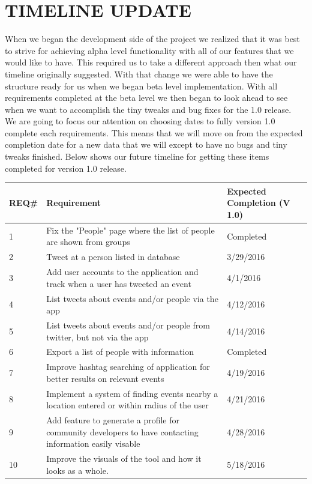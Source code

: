 \documentclass[letterpaper,10pt,onecolumn]{IEEEtran} %
\begin{document}
\section{TIMELINE UPDATE}
When we began the development side of the project we realized that it was best to strive for achieving alpha level functionality with all of our features that we would like to have. This required us to take a different approach then what our timeline originally suggested. With that change we were able to have the structure ready for us when we began beta level implementation. With all requirements completed at the beta level we then began to look ahead to see when we want to accomplish the tiny tweaks and bug fixes for the 1.0 release. \\

We are going to focus our attention on choosing dates to fully version 1.0 complete each requirements. This means that we will move on from the expected completion date for a new data that we will except to have no bugs and tiny tweaks finished. Below shows our future timeline for getting these items completed for version 1.0 release. \\



\begin{center}
\begin{tabular}{ | m{1cm} | m{7cm}| m{4cm} | } 
\hline
REQ\# & Requirement & Expected Completion (V 1.0) \\ 
\hline
1 & Fix the "People" page where the list of people are shown from groups & Completed \\ 
\hline
2 & Tweet at a person listed in database & 3/29/2016 \\ 
\hline
3 & Add user accounts to the application and track when a user has tweeted an event & 4/1/2016 \\ 
\hline
4 & List tweets about events and/or people via the app & 4/12/2016 \\ 
\hline
5 & List tweets about events and/or people from twitter, but not via the app & 4/14/2016 \\ 
\hline
6 & Export a list of people with information & Completed \\ 
\hline
7 & Improve hashtag searching of application for better results on relevant events & 4/19/2016 \\ 
\hline
8 & Implement a system of finding events nearby a location entered or within radius of the user & 4/21/2016 \\ 
\hline
9 & Add feature to generate a profile for community developers to have contacting information easily visable & 4/28/2016 \\ 
\hline
10 & Improve the visuals of the tool and how it looks as a whole. & 5/18/2016 \\ 
\hline
\end{tabular}
\end{center}
\end{document}
